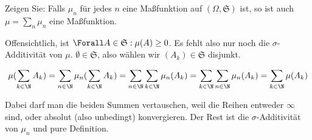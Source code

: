 \begin{exercise}

Zeigen Sie: Falls $\mu_n$ für jedes $n$ eine Maßfunktion auf $(\Omega, \mathfrak{S})$ ist, so ist auch $\mu = \sum_n \mu_n$ eine Maßfunktion.

\end{exercise}


\begin{solution}

Offensichtlich, ist $\Forall A \in \mathfrak{S}: \mu(A) \geq 0$. Es fehlt also nur noch die $\sigma$-Additivität von $\mu$. $\emptyset \in \mathfrak{S}$, also wählen wir $(A_k) \in \mathfrak{S}$ disjunkt.

\begin{align*}
  \mu(\sum_{k \in \N} A_k)
  =
  \sum_{n \in \N} \mu_n(\sum_{k \in \N} A_k)
  =
  \sum_{n \in \N} \sum_{k \in \N} \mu_n(A_k)
  =
  \sum_{k \in \N} \sum_{n \in \N} \mu_n(A_k)
  =
  \sum_{k \in \N} \mu(A_k)
\end{align*}

Dabei darf man die beiden Summen vertauschen, weil die Reihen entweder $\infty$ sind, oder absolut (also unbedingt) konvergieren. Der Rest ist die $\sigma$-Additivität von $\mu_n$ und pure Definition.

\end{solution}
